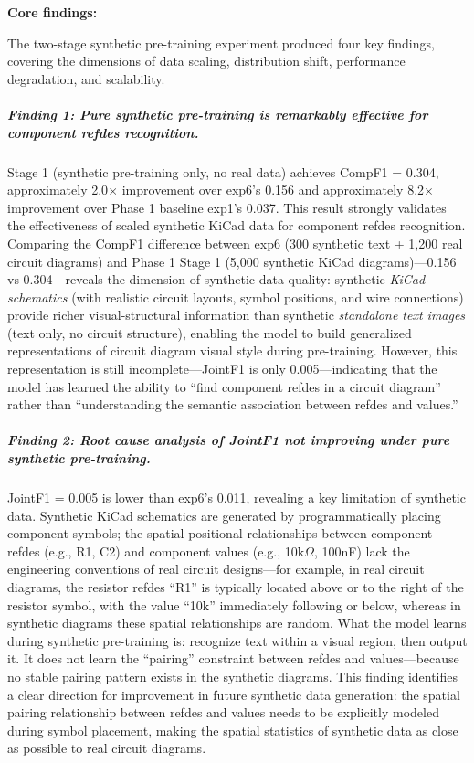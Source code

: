 \textbf{Core findings:}

The two-stage synthetic pre-training experiment produced four key findings, covering the dimensions of data scaling, distribution shift, performance degradation, and scalability.

\subparagraph{Finding 1: Pure synthetic pre-training is remarkably effective for component refdes recognition.}
Stage 1 (synthetic pre-training only, no real data) achieves CompF1 = 0.304, approximately 2.0$\times$ improvement over exp6's 0.156 and approximately 8.2$\times$ improvement over Phase 1 baseline exp1's 0.037. This result strongly validates the effectiveness of scaled synthetic KiCad data for component refdes recognition. Comparing the CompF1 difference between exp6 (300 synthetic text + 1,200 real circuit diagrams) and Phase 1 Stage 1 (5,000 synthetic KiCad diagrams)---0.156 vs 0.304---reveals the dimension of synthetic data quality: synthetic \textit{KiCad schematics} (with realistic circuit layouts, symbol positions, and wire connections) provide richer visual-structural information than synthetic \textit{standalone text images} (text only, no circuit structure), enabling the model to build generalized representations of circuit diagram visual style during pre-training. However, this representation is still incomplete---JointF1 is only 0.005---indicating that the model has learned the ability to ``find component refdes in a circuit diagram'' rather than ``understanding the semantic association between refdes and values.''

\subparagraph{Finding 2: Root cause analysis of JointF1 not improving under pure synthetic pre-training.}
JointF1 = 0.005 is lower than exp6's 0.011, revealing a key limitation of synthetic data. Synthetic KiCad schematics are generated by programmatically placing component symbols; the spatial positional relationships between component refdes (e.g., R1, C2) and component values (e.g., 10k$\Omega$, 100nF) lack the engineering conventions of real circuit designs---for example, in real circuit diagrams, the resistor refdes ``R1'' is typically located above or to the right of the resistor symbol, with the value ``10k'' immediately following or below, whereas in synthetic diagrams these spatial relationships are random. What the model learns during synthetic pre-training is: recognize text within a visual region, then output it. It does not learn the ``pairing'' constraint between refdes and values---because no stable pairing pattern exists in the synthetic diagrams. This finding identifies a clear direction for improvement in future synthetic data generation: the spatial pairing relationship between refdes and values needs to be explicitly modeled during symbol placement, making the spatial statistics of synthetic data as close as possible to real circuit diagrams.


